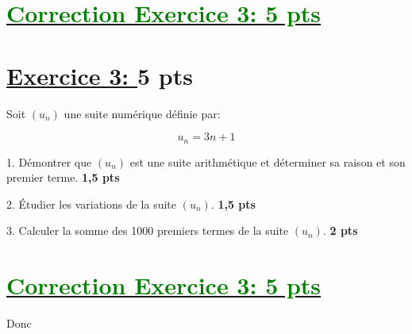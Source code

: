 \documentclass[12pt]{article}
\begin{document}
\section*{\underline{\textcolor{green}{Correction Exercice 3: \textbf{5 pts}}}}
\section*{\underline{Exercice 3: }\textbf{5 pts}}
Soit $(u_n)$ une suite numérique définie par:

\[ u_n = 3n + 1 \]

1. Démontrer que $(u_n)$ est une suite arithmétique et déterminer sa raison et son premier terme. \textbf{1,5 pts}

2. Étudier les variations de la suite $(u_n)$. \textbf{1,5 pts}

3. Calculer la somme des 1000 premiers termes de la suite $(u_n)$. \textbf{2 pts}

\section*{\underline{\textcolor{green}{Correction Exercice 3: \textbf{5 pts}}}}
Donc \textcolor{green}{}
\end{document}
